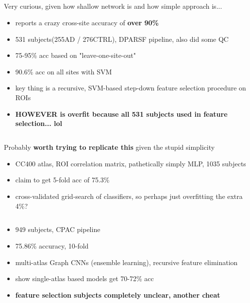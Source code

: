 \documentclass[10pt]{article}
\begin{document}
\subsection{\citet{wangFunctionalConnectivitybasedClassification2019}}

Very curious, given how shallow network is and how simple approach is...

\begin{itemize}
  \item reports a crazy cross-site accuracy of \textbf{over 90\%}
  \item  531 subjects(255AD / 276CTRL), DPARSF pipeline, also did some QC
  \item 75-95\% acc based on "leave-one-site-out"
  \item 90.6\% acc on all sites with SVM
  \item key thing is a recursive, SVM-based step-down feature selection procedure on ROIs
  \item \textbf{HOWEVER is overfit because all 531 subjects used in feature selection... lol}
\end{itemize}

\subsection{\citet{yangDeepNeuralNetwork2020}}

Probably \textbf{worth trying to replicate this} given the stupid simplicity

\begin{itemize}
  \item CC400 atlas, ROI correlation matrix, pathetically simply MLP, 1035 subjects
  \item claim to get 5-fold acc of 75.3\%
  \item cross-validated grid-search of classifiers, so perhaps just overfitting the extra 4\%?
\end{itemize}

\subsection{\citet{wangMAGEAutomaticDiagnosis2021}}

\begin{itemize}
  \item 949 subjects, CPAC pipeline
  \item 75.86\% accuracy, 10-fold
  \item multi-atlas Graph CNNs (ensemble learning), recursive feature elimination
  \item show single-atlas based models get 70-72\% acc
  \item \textbf{feature selection subjects completely unclear, another cheat}
\end{itemize}
\end{document}

